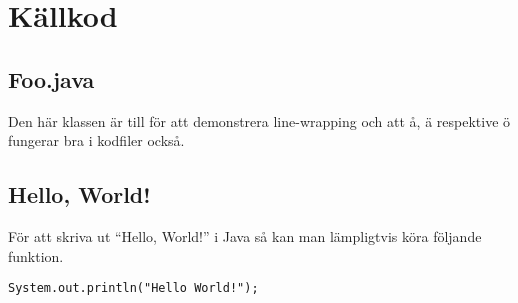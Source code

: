 \documentclass[a4paper,10pt,twoside]{article}
\begin{document}
\section{Källkod} %
\label{sec:källkod}

\subsection{Foo.java} %
\label{sub:foo_java}

Den här klassen är till för att demonstrera line-wrapping och att å, ä respektive ö fungerar bra i kodfiler också.



\subsection{Hello, World!}

För att skriva ut ``Hello, World!'' i Java så kan man lämpligtvis köra följande funktion.

\begin{lstlisting}
System.out.println("Hello World!");
\end{lstlisting}

\end{document}
